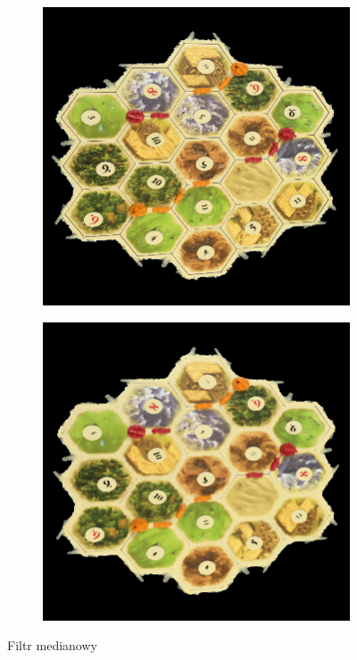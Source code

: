 \documentclass[a4paper]{article}
\begin{document}
    \begin{figure}[H]
        \begin{subfigure}[]{.5\linewidth}
        \includegraphics[width=\linewidth]{pictures/fields/pre_blur.png}

        \end{subfigure}
        \begin{subfigure}[]{0.5\linewidth}
        \includegraphics[width=\linewidth]{pictures/fields/after_blur.png}
        \end{subfigure}

        \caption{Filtr medianowy}
        \label{fig:step3}
    \end{figure}
    
\end{document}
